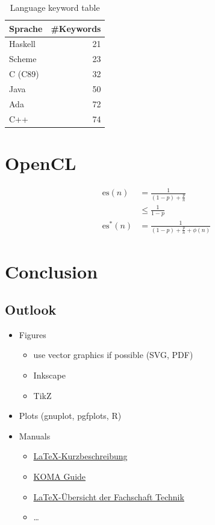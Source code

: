 \documentclass{scrartcl}
\begin{document}
\begin{table}
  \caption{Language keyword table}
  \label{tab:lang}
  \begin{tabular}{lr}
    \toprule
    Sprache  & \#Keywords \\
    \midrule
    Haskell  & 21         \\
    Scheme   & 23         \\
    C (C89)  & 32         \\
    Java     & 50         \\
    Ada      & 72         \\
    C++      & 74         \\
    \bottomrule
  \end{tabular}
\end{table}

\section{OpenCL}

\begin{align}
  \text{es}(n) & = \frac{1}{(1-p) + \frac{p}{n}} \\ & \le \frac{1}{1-p} \\
  \text{es}^{*}(n) & = \frac{1}{(1-p) + \frac{p}{n} + \phi(n)}
\end{align}

\section{Conclusion}

\subsection{Outlook}

  \begin{itemize}
    \item Figures
      \begin{itemize}
        \item use vector graphics if possible (SVG, PDF)
        \item Inkscape
        \item TikZ
      \end{itemize}
    \item Plots (gnuplot, pgfplots, R)
    \item Manuals
      \begin{itemize}
        \item
          \href{http://www.ctan.org/tex-archive/info/lshort/german/l2kurz.pdf}{\LaTeX{}-Kurzbeschreibung}
        \item \href{http://www.ctan.org/tex-archive/macros/latex/contrib/koma-script/scrguide.pdf}{KOMA Guide}
        \item
          \href{http://fachschaft.techfak.uni-bielefeld.de/fswiki/LaTeX}{\LaTeX{}-Übersicht der Fachschaft Technik}
        \item \dots
    \end{itemize}
  \end{itemize}


\printbibliography
\end{document}
